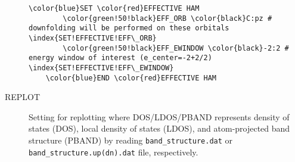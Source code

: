 \documentclass[a4paper,12pt]{scrartcl}
\makeatletter
\def\namedlabel#1#2{\begingroup
    #2%
    \def\@currentlabel{#2}%
    \phantomsection\label{#1}\endgroup
}
\makeatother
\begin{document}
\begin{description}
 \begin{Verbatim}[commandchars=\\\{\},gobble=4, frame=single, framesep=2mm, 
	label= Effective Hamiltonian construction,
	labelposition=bottomline]
    \color{blue}SET \color{red}EFFECTIVE HAM
        \color{green!50!black}EFF_ORB \color{black}C:pz # downfolding will be performed on these orbitals  \index{SET!EFFECTIVE!EFF\_ORB}
        \color{green!50!black}EFF_EWINDOW \color{black}-2:2 # energy window of interest (e_center=-2+2/2)  \index{SET!EFFECTIVE!EFF\_EWINDOW}
    \color{blue}END \color{red}EFFECTIVE HAM
 \end{Verbatim}


     \item[\namedlabel{tag:REPLOT}{REPLOT}]  
		Setting for replotting where DOS/LDOS/PBAND represents density of states (DOS), local density of states (LDOS), and atom-projected band structure (PBAND) by reading \texttt{band\_structure.dat} or \texttt{band\_structure.up(dn).dat} file, respectively.
		

\end{description}
\end{document}

